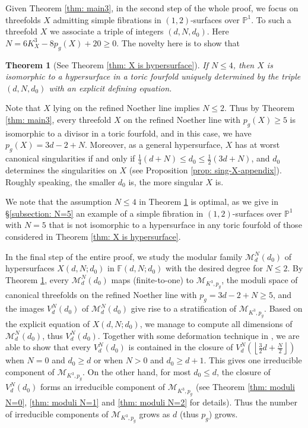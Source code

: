 \documentclass[a4paper,11pt]{amsart}
\newcommand{\M}{\ensuremath{\mathcal{M}}}
\newcommand{\FF}{\ensuremath{\mathbb{F}}}
\newcommand{\PP}{\ensuremath{\mathbb{P}}}
\newtheorem{thm}{Theorem}[section]
\theoremstyle{definition}
\theoremstyle{remark}
\numberwithin{equation}{section}
\begin{document}
Given Theorem \ref{thm: main3}, in the second step of the whole proof, we focus on threefolds $X$ admitting simple fibrations in $(1, 2)$-surfaces over $\PP^1$. To such a threefold $X$ we associate a triple of integers $(d, N, d_0)$. Here $N = 6K_X^3 - 8p_g(X) + 20 \ge 0$. The novelty here is to show that

\begin{thm} [See Theorem \ref{thm: X is hypersurface}] \label{thm: main4}
    If $N \le 4$, then $X$ is isomorphic to a hypersurface in a toric fourfold  uniquely determined by the triple $(d, N, d_0)$ with an explicit defining equation.
\end{thm}

Note that $X$ lying on the refined Noether line implies $N \le 2$. Thus by Theorem \ref{thm: main3}, every threefold $X$ on the refined Noether line with $p_g(X) \ge 5$ is isomorphic to a divisor in a toric fourfold, and in this case, we have $p_g(X) = 3d - 2 + N$. Moreover, as a general hypersurface, $X$ has at worst canonical singularities if and only if $\frac{1}{4}(d + N) \le d_0 \le \frac{1}{2}(3d + N)$, and $d_0$ determines the singularities on $X$ (see Proposition \ref{prop: sing-X-appendix}). Roughly speaking, the smaller $d_0$ is, the more singular $X$ is.

We note that the assumption $N \le 4$ in Theorem \ref{thm: main4} is optimal, as we give in \S \ref{subsection: N=5} an example of a simple fibration in $(1, 2)$-surfaces over $\PP^1$ with $N = 5$ that is not isomorphic to a hypersurface in any toric fourfold of those considered in Theorem \ref{thm: X is hypersurface}.

In the final step of the entire proof, we study the modular family $\M^N_d(d_0)$ of hypersurfaces $X(d, N; d_0)$ in $\FF(d, N; d_0)$ with the desired degree for $N \le 2$. By Theorem \ref{thm: main4}, every $\M^N_d(d_0)$ maps (finite-to-one) to $\M_{K^3, p_g}$, the moduli space of canonical threefolds on the refined Noether line with $p_g = 3d - 2 + N \ge 5$, and the images $V_d^N(d_0)$ of $\M^N_d(d_0)$ give rise to a stratification of $\M_{K^3, p_g}$. Based on the explicit equation of $X(d, N; d_0)$, we manage to compute all dimensions of $\M^N_d(d_0)$, thus $V_d^N(d_0)$. Together with some deformation technique in \cite{Pignatelli}, we are able to show that every $V_d^N(d_0)$ is contained in the closure of $V^N_d\left( \left\lfloor \frac32 d + \frac N2 \right\rfloor \right)$ when $N = 0$ and $d_0 \ge d$ or when $N > 0$ and $d_0 \ge d + 1$. This gives one irreducible component of $\M_{K^3, p_g}$. On the other hand, for most $d_0 \le d$, the closure of $V_d^N(d_0)$ forms an irreducible component of $\M_{K^3, p_g}$ (see Theorem \ref{thm: moduli N=0}, \ref{thm: moduli N=1} and \ref{thm: moduli N=2} for details). Thus the number of irreducible components of $\M_{K^3, p_g}$ grows as $d$ (thus $p_g$) grows.
\end{document}
